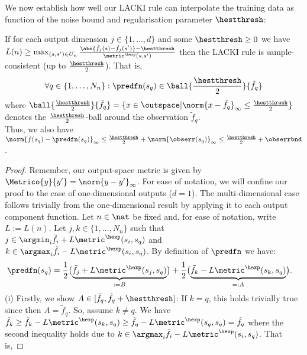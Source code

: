 We now establish how well our LACKI rule can interpolate the training data as function of the noise bound and regularisation parameter $\hestthresh$: 
\begin{lem} \label{lem:LACKIsampleconsistency} If for each output dimension $j \in \{1,...,d\}$ and some $\hestthresh \geq 0$ we have $L(n)  \geq  \max_{(s,s') \in U_n} \frac{\abs{\tilde f_j(s)- \tilde f_j(s')} -\hestthresh }{\metric^\hexp(s,s')}
$ then the LACKI rule is sample-consistent (up to $\frac \hestthresh 2$). 
That is,  \[\forall q \in \{1,\ldots,N_n \}:  \predfn(s_q) \in \ball{\frac \hestthresh 2}{\tilde f_q} \] where $\ball{\frac \hestthresh 2}{\tilde f_q} =\{ x \in \outspace |  \norm{x-\tilde f_q}_\infty \leq \frac \hestthresh 2\}$ denotes the $\frac \hestthresh 2$-ball around the observation $\tilde f_q$.\\
Thus, we also have $\norm{ f(s_q) - \predfn(s_q)}_\infty \leq \frac \hestthresh 2 + \norm{\obserr(s_q)}_\infty \leq \frac \hestthresh 2 + \obserrbnd$.
\begin{proof}
Remember, our output-space metric is given by $\Metrico{y}{y'} = \norm{y-y'}_\infty$.
For ease of notation, we will confine our proof to the case of one-dimensional outputs ($d=1$). The multi-dimensional case follows trivially from the one-dimensional result by applying it to each output component function. 
Let $n \in \nat  $ be fixed and, for ease of notation, write $L := L(n)$. Let $j,k \in   \{1,\ldots,N_n \} $ such that $j \in \argmin_i \tilde f_i + L \metric^\hexp(s_i,s_q) $ and 
$k \in \argmax_i \tilde f_i - L \metric^\hexp(s_i,s_q) $. 
By definition of $\predfn$ we have:
\begin{align}
\predfn(s_q) 
&= \frac 1 2 \bigl(\underbrace{ \tilde f_j + L \metric^\hexp(s_j,s_q)}_{:=B}   \bigr) + \frac 1 2 \bigl( \underbrace{\tilde  f_k - L \metric^\hexp(s_k,s_q) }_{=:A}\bigr). \label{eq:hru582jsokbbbn}
\end{align}
%
%
(i) Firstly, we show  \underline{$ A \in [\tilde f_q, \tilde f_q +\hestthresh]$}:
If $k = q$, this holds trivially true since then $A= \tilde f_q$. 
So, assume $k \neq q$. 
We have $\tilde f_k \geq \tilde f_k - L \metric^\hexp(s_k,s_q)  \geq \tilde f_q - L \metric^\hexp(s_q,s_q)  = \tilde f_q$ where the second inequality holds due to $k \in \argmax_i \tilde f_i - L \metric^\hexp(s_i,s_q) $. That is,

\end{proof}
\end{lem}
